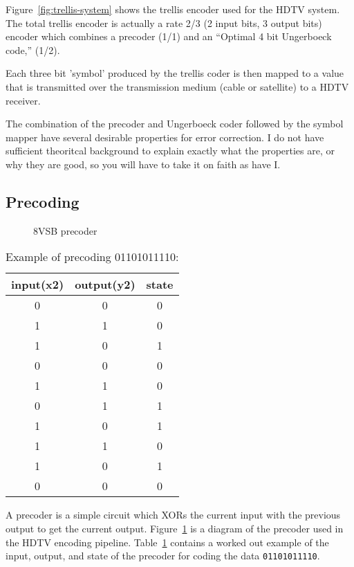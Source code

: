\documentclass{article}
\begin{document}
Figure~\ref{fig:trellis-system} shows the trellis encoder used for the HDTV system. 
The total trellis encoder is actually a rate 2/3 (2 input bits, 3 output bits) 
encoder which combines a precoder (1/1) and an ``Optimal 4 bit 
Ungerboeck code,'' (1/2).

Each three bit 'symbol' produced by the trellis coder is then mapped to a value
that is transmitted over the transmission medium (cable or satellite) to 
a HDTV receiver. 

The combination of the precoder and Ungerboeck coder followed by the symbol mapper
have several desirable properties for error correction. I do not have sufficient
theoritcal background to explain exactly what the properties are, or why they are good,
so you will have to take it on faith as have I.


\subsection{Precoding}
\begin{figure}
\center
\epsfxsize=3.5in
\caption{8VSB precoder}
\label{fig:precoder}
\end{figure}

\begin{table}
\center
	\begin{tabular}{c|c|c}
input(x2) & output(y2) & state  \\
\hline
0 & 0 & 0 \\
1 & 1 & 0 \\
1 & 0 & 1 \\
0 & 0 & 0 \\
1 & 1 & 0 \\
0 & 1 & 1 \\
1 & 0 & 1 \\
1 & 1 & 0 \\
1 & 0 & 1 \\
0 & 0 & 0 \\
\end{tabular}
\caption{Example of precoding 01101011110:}
\label{tbl:precoding_example}
\end{table}

A precoder is a simple circuit which XORs the current input with the previous
output to get the current output. Figure~\ref{fig:precoder} is a diagram of the
precoder used in the HDTV encoding pipeline. Table~\ref{tbl:precoding_example} 
contains a worked out example of the input, output, and state of the precoder
for coding the data \texttt{01101011110}.
\end{document}
